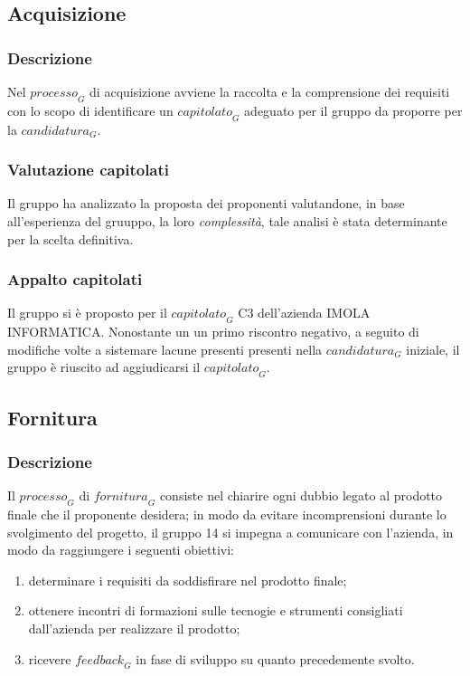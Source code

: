 \subsection{Acquisizione}
\subsubsection{Descrizione}
Nel $\textit{processo}_G$ di acquisizione avviene la raccolta e la comprensione dei requisiti con lo scopo di identificare un $\textit{capitolato}_G$ adeguato per il gruppo da proporre per la $\textit{candidatura}_G$.
\subsubsection{Valutazione capitolati}
Il gruppo ha analizzato la proposta dei proponenti valutandone, in base all'esperienza del gruuppo, la loro \textit{complessità}, tale analisi è stata determinante per la scelta definitiva.
\subsubsection{Appalto capitolati}
Il gruppo si è proposto per il $\textit{capitolato}_G$ C3 dell'azienda IMOLA INFORMATICA. Nonostante un  un primo riscontro negativo, a seguito di modifiche volte a sistemare lacune presenti  presenti nella $\textit{candidatura}_G$ iniziale, il gruppo è riuscito ad aggiudicarsi il $\textit{capitolato}_G$.

\subsection{Fornitura}
\subsubsection{Descrizione}
Il $\textit{processo}_G$ di $\textit{fornitura}_G$ consiste nel chiarire ogni dubbio legato al prodotto finale che il proponente desidera; in modo da evitare incomprensioni durante lo svolgimento del progetto, il gruppo 14 si impegna a comunicare con l'azienda, in modo da raggiungere i seguenti obiettivi:
\begin{enumerate}
    \item determinare i requisiti da soddisfirare nel prodotto finale;
    \item ottenere incontri di formazioni sulle tecnogie e strumenti consigliati dall'azienda per realizzare il prodotto;
    \item ricevere $\textit{feedback}_G$ in fase di sviluppo su quanto precedemente svolto.
\end{enumerate}
